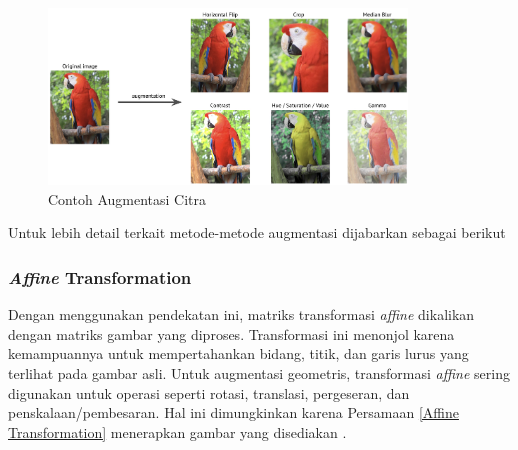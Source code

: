     
    \begin{figure}[H]
      \centering
      \includegraphics[width=0.85\textwidth]{figures/bab2/augmentation.jpg}
      \caption{Contoh Augmentasi Citra \cite{info11020125}}
      \label{Contoh Augmentasi Citra}
    \end{figure}


    Untuk lebih detail terkait metode-metode augmentasi dijabarkan sebagai berikut

    \subsubsection{\textit{Affine} Transformation}

    
        Dengan menggunakan pendekatan ini, matriks transformasi \textit{affine} dikalikan dengan matriks gambar yang diproses. Transformasi ini menonjol karena kemampuannya untuk mempertahankan bidang, titik, dan garis lurus yang terlihat pada gambar asli. Untuk augmentasi geometris, transformasi \textit{affine} sering digunakan untuk operasi seperti rotasi, translasi, pergeseran, dan penskalaan/pembesaran. Hal ini dimungkinkan karena Persamaan \ref{Affine Transformation} menerapkan gambar yang disediakan \cite{Gonzalez2009}.

   

